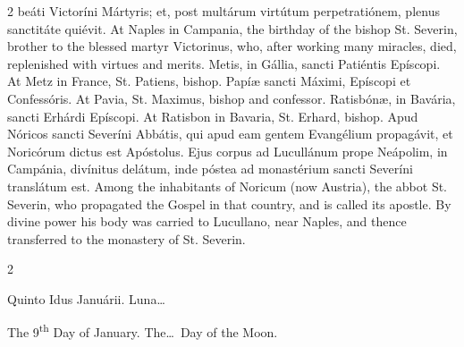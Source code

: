 \begin{paracol}{2}
 beáti Victoríni Mártyris; et, post multárum virtútum perpetratiónem, plenus 
 sanctitáte quiévit.
\switchcolumn
{}
At Naples in Campania, the birthday of the bishop St. Severin, brother to 
 the blessed martyr Victorinus, who, after working many miracles, died, 
 replenished with virtues and merits.
\switchcolumn*
{}
Metis, in Gállia, sancti Patiéntis Epíscopi.
\switchcolumn
{}
At Metz in France, St. Patiens, bishop.
\switchcolumn*
{}
Papíæ sancti Máximi, Epíscopi et Confessóris.
\switchcolumn
{}
At Pavia, St. Maximus, bishop and confessor.
\switchcolumn*
{}
Ratisbónæ, in Bavária, sancti Erhárdi Epíscopi.
\switchcolumn
{}
At Ratisbon in Bavaria, St. Erhard, bishop.
\switchcolumn*
{}
Apud Nóricos sancti Severíni Abbátis, qui apud 
 eam gentem Evangélium propagávit, et Noricórum dictus est Apóstolus. 
 Ejus corpus ad Lucullánum prope Neápolim, in Campánia, divínitus delátum, 
 inde póstea ad monastérium sancti Severíni translátum est.
\switchcolumn
{}
Among the inhabitants of Noricum (now Austria), the abbot St. Severin, who 
 propagated the Gospel in that country, and is called its apostle. By 
 divine power his body was carried to Lucullano, near Naples, and thence 
 transferred to the monastery of St. Severin.
\switchcolumn*
{}
\end{paracol}


\begin{paracol}{2}
\begin{center}{\color{gregoriocolor} Quinto Idus Januárii. 
 Luna\dots\ }\end{center}
\switchcolumn
{}
\begin{center}{\color{gregoriocolor} The 9\textsuperscript{th} Day of 
 January. The\dots\ Day of the Moon.}\end{center}
\end{paracol}


